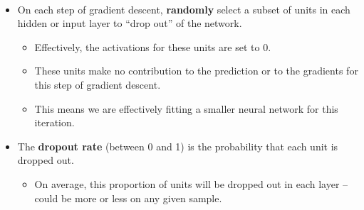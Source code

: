 \documentclass[11pt]{article}
\providecommand{\tightlist}{%
      \setlength{\itemsep}{0pt}\setlength{\parskip}{0pt}}
\begin{document}
    \begin{center}
    \end{center}
    { \hspace*{\fill} \\}
    
    \begin{itemize}
\tightlist
\item
  On each step of gradient descent, \textbf{randomly} select a subset of
  units in each hidden or input layer to ``drop out'' of the network.

  \begin{itemize}
  \tightlist
  \item
    Effectively, the activations for these units are set to 0.
  \item
    These units make no contribution to the prediction or to the
    gradients for this step of gradient descent.
  \item
    This means we are effectively fitting a smaller neural network for
    this iteration.
  \end{itemize}
\item
  The \textbf{dropout rate} (between 0 and 1) is the probability that
  each unit is dropped out.

  \begin{itemize}
  \tightlist
  \item
    On average, this proportion of units will be dropped out in each
    layer -- could be more or less on any given sample.
  \end{itemize}
\end{itemize}
\end{document}
